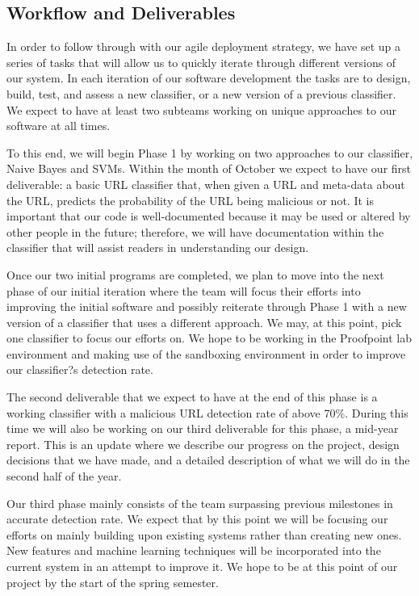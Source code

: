 \documentclass[cs,proposal]{hmcclinic}
\begin{document}
\subsection{Workflow and Deliverables}

In order to follow through with our agile deployment strategy, we have set up a series of tasks that will allow us to quickly iterate through different versions of our system. In each iteration of our software development the tasks are to design, build, test, and assess a new classifier, or a new version of a previous classifier. We expect to have at least two subteams working on unique approaches to our software at all times.

To this end, we will begin Phase 1 by working on two approaches to our classifier, Naive Bayes and SVMs. Within the month of October we expect to have our first deliverable: a basic URL classifier that, when given a URL and meta-data about the URL, predicts the probability of the URL being malicious or not. It is important that our code is well-documented because it may be used or altered by other people in the future; therefore, we will have documentation within the classifier that will assist readers in understanding our design.

Once our two initial programs are completed, we plan to move into the next phase of our initial iteration where the team will focus their efforts into improving the initial software and possibly reiterate through Phase 1 with a new version of a classifier that uses a different approach. We may, at this point, pick one classifier to focus our efforts on. We hope to be working in the Proofpoint lab environment and making use of the sandboxing environment in order to improve our classifier?s detection rate.

The second deliverable that we expect to have at the end of this phase is a working classifier with a malicious URL detection rate of above 70\%. During this time we will also be working on our third deliverable for this phase, a mid-year report. This is an update where we describe our progress on the project, design decisions that we have made, and a detailed description of what we will do in the second half of the year.

Our third phase mainly consists of the team surpassing previous milestones in accurate detection rate. We expect that by this point we will be focusing our efforts on mainly building upon existing systems rather than creating new ones. New features and machine learning techniques will be incorporated into the current system in an attempt to improve it. We hope to be at this point of our project by the start of the spring semester.
\end{document}
